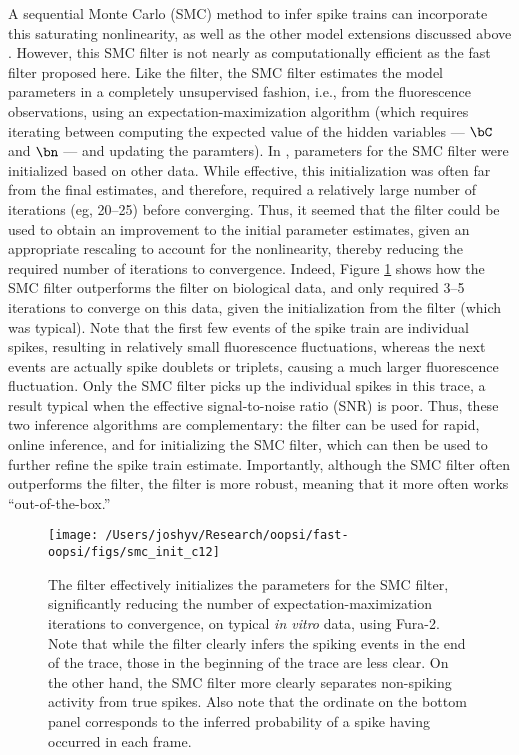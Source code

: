 A sequential Monte Carlo (SMC) method to infer spike trains can incorporate this saturating nonlinearity, as well as the other model extensions discussed above \cite{VogelsteinPaninski09} . However, this SMC filter is not nearly as computationally efficient as the fast filter proposed here.  Like the \foopsi filter, the SMC filter estimates the model parameters in a completely unsupervised fashion, i.e.,  from the fluorescence observations, using an expectation-maximization algorithm (which requires iterating between computing the expected value of the hidden variables --- $\bC$ and $\bn$ --- and updating the paramters).  In \cite{VogelsteinPaninski09}, parameters for the SMC filter were initialized based on other data.  While effective, this initialization was often far from the final estimates, and therefore, required a relatively large number of iterations (eg, 20--25) before converging.  Thus, it seemed that the \foopsi filter could be used to obtain an improvement to the initial parameter estimates, given an appropriate rescaling to account for the nonlinearity, thereby reducing the required number of iterations to convergence.  Indeed, Figure \ref{fig:smc_init} shows how the SMC filter outperforms the \foopsi filter on biological data, and only required 3--5 iterations to converge on this data, given the initialization from the \foopsi filter (which was typical).  Note that the first few events of the spike train are individual spikes, resulting in relatively small fluorescence fluctuations, whereas the next events are actually spike doublets or triplets, causing a much larger fluorescence fluctuation.  Only the SMC filter picks up the individual spikes in this trace, a result typical when the effective signal-to-noise ratio (SNR) is poor.  Thus, these two inference algorithms are complementary: the \foopsi filter can be used for rapid, online inference, and for initializing the SMC filter, which can then be used to further refine the spike train estimate.  Importantly, although the SMC filter often outperforms the \foopsi filter, the \foopsi filter is more robust, meaning that it more often works ``out-of-the-box.''

\begin{figure}[h!]
\centering \texttt{[image: /Users/joshyv/Research/oopsi/fast-oopsi/figs/smc\_init\_c12]}
\caption[\foopsi filter can initialize Wiener filter]{The \foopsi filter effectively initializes the parameters for the SMC filter, significantly reducing the number of expectation-maximization iterations to convergence, on typical \emph{in vitro} data, using Fura-2.  Note that while the \foopsi filter clearly infers the spiking events in the end of the trace, those in the beginning of the trace are less clear.  On the other hand, the SMC filter more clearly separates non-spiking activity from true spikes.  Also note that the ordinate on the bottom panel corresponds to the inferred probability of a spike having occurred in each frame.} \label{fig:smc_init}
\end{figure}

